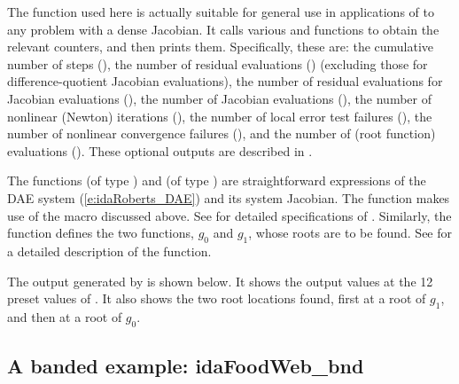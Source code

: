 The function  used here is actually suitable for
general use in applications of {\ida} to any problem with a dense
Jacobian.  It calls various  and 
functions to obtain the relevant counters, and then prints them.
Specifically, these are: the cumulative number of steps (), 
the number of residual evaluations () (excluding those for
difference-quotient Jacobian evaluations),
the number of residual evaluations for Jacobian evaluations (),
the number of Jacobian evaluations (),
the number of nonlinear (Newton) iterations (),
the number of local error test failures (),
the number of nonlinear convergence failures (),
and the number of  (root function) evaluations ().
These optional outputs are described in .

The functions  (of type ) and  (of type
) are straightforward expressions of the DAE system
(\ref{e:idaRoberts_DAE}) and its system Jacobian.  The function 
makes use of the macro  discussed above.  See 
for detailed specifications of .  Similarly, the function
 defines the two functions, $g_0$ and $g_1$, whose roots are
to be found.  See  for a detailed description of the
 function.

The output generated by  is shown below.  It shows the output
values at the 12 preset values of .  It also shows the two root
locations found, first at a root of $g_1$, and then at a root of $g_0$.

\subsection{A banded example: idaFoodWeb\_bnd}\label{ss:idaFoodWeb}

